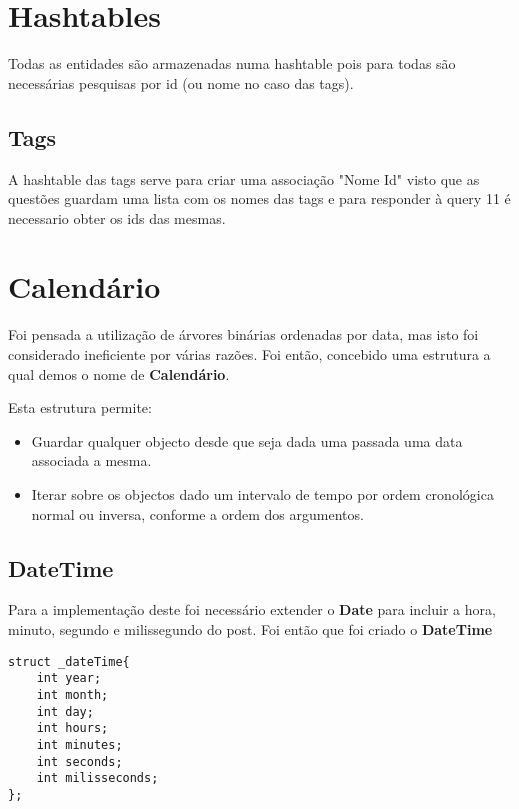\documentclass[10pt,a4paper]{report}
\begin{document}
    \section{Hashtables}
        Todas as entidades são armazenadas numa hashtable pois para todas são
        necessárias pesquisas por id (ou nome no caso das tags).
        \subsection{Tags}
        A hashtable das tags serve para criar uma associação "Nome Id" visto que
        as questões guardam uma lista com os nomes das tags e para responder à
        query 11 é necessario obter os ids das mesmas.

    \section{Calendário}
        Foi pensada a utilização de árvores binárias ordenadas por data,
        mas isto foi considerado ineficiente por várias razões. Foi então,
        concebido uma estrutura a qual demos o nome de \textbf{Calendário}.

        Esta estrutura permite:
        \begin{itemize}
                \item Guardar qualquer objecto desde que seja dada
                      uma passada uma data associada a mesma.
                \item Iterar sobre os objectos dado um intervalo de tempo
                      por ordem cronológica normal ou inversa, conforme a
                      ordem dos argumentos.
        \end{itemize}
        \subsection{DateTime}
        Para a implementação deste foi necessário extender o \textbf{Date} para
        incluir a hora, minuto, segundo e milissegundo do post. Foi então que
        foi criado o \textbf{DateTime}
    \begin{verbatim}
struct _dateTime{
    int year;
    int month;
    int day;
    int hours;
    int minutes;
    int seconds;
    int milisseconds;
};
    \end{verbatim}
\end{document}
